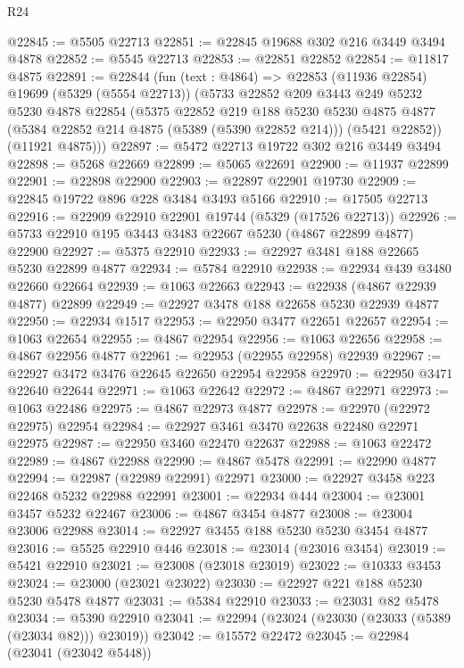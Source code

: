 \begin{lexlean}{R24}
\begin{coremodule}
@22845 := @5505 @22713
@22851 := @22845 @19688 @302 @216 @3449 @3494 @4878
@22852 := @5545 @22713
@22853 := @22851 @22852
@22854 := @11817 @4875
@22891 := @22844
    (fun (text : @4864) =>
    @22853
      (@11936 @22854)
      @19699
      (@5329 (@5554 @22713))
      (@5733
        @22852
        @209
        @3443
        @249
        @5232
        @5230
        @4878
        @22854
        (@5375
          @22852
          @219
          @188
          @5230
          @5230
          @4875
          @4877
          (@5384 @22852 @214 @4875 (@5389 (@5390 @22852 @214)))
          (@5421 @22852))
        (@11921 @4875)))
@22897 := @5472 @22713 @19722 @302 @216 @3449 @3494
@22898 := @5268 @22669
@22899 := @5065 @22691
@22900 := @11937 @22899
@22901 := @22898 @22900
@22903 := @22897 @22901 @19730
@22909 := @22845 @19722 @896 @228 @3484 @3493 @5166
@22910 := @17505 @22713
@22916 := @22909 @22910 @22901 @19744 (@5329 (@17526 @22713))
@22926 := @5733 @22910 @195 @3443 @3483 @22667 @5230 (@4867 @22899 @4877) @22900
@22927 := @5375 @22910
@22933 := @22927 @3481 @188 @22665 @5230 @22899 @4877
@22934 := @5784 @22910
@22938 := @22934 @439 @3480 @22660 @22664
@22939 := @1063 @22663
@22943 := @22938 (@4867 @22939 @4877) @22899
@22949 := @22927 @3478 @188 @22658 @5230 @22939 @4877
@22950 := @22934 @1517
@22953 := @22950 @3477 @22651 @22657
@22954 := @1063 @22654
@22955 := @4867 @22954
@22956 := @1063 @22656
@22958 := @4867 @22956 @4877
@22961 := @22953 (@22955 @22958) @22939
@22967 := @22927 @3472 @3476 @22645 @22650 @22954 @22958
@22970 := @22950 @3471 @22640 @22644
@22971 := @1063 @22642
@22972 := @4867 @22971
@22973 := @1063 @22486
@22975 := @4867 @22973 @4877
@22978 := @22970 (@22972 @22975) @22954
@22984 := @22927 @3461 @3470 @22638 @22480 @22971 @22975
@22987 := @22950 @3460 @22470 @22637
@22988 := @1063 @22472
@22989 := @4867 @22988
@22990 := @4867 @5478
@22991 := @22990 @4877
@22994 := @22987 (@22989 @22991) @22971
@23000 := @22927 @3458 @223 @22468 @5232 @22988 @22991
@23001 := @22934 @444
@23004 := @23001 @3457 @5232 @22467
@23006 := @4867 @3454 @4877
@23008 := @23004 @23006 @22988
@23014 := @22927 @3455 @188 @5230 @5230 @3454 @4877
@23016 := @5525 @22910 @446
@23018 := @23014 (@23016 @3454)
@23019 := @5421 @22910
@23021 := @23008 (@23018 @23019)
@23022 := @10333 @3453
@23024 := @23000 (@23021 @23022)
@23030 := @22927 @221 @188 @5230 @5230 @5478 @4877
@23031 := @5384 @22910
@23033 := @23031 @82 @5478
@23034 := @5390 @22910
@23041 := @22994 (@23024 (@23030 (@23033 (@5389 (@23034 @82))) @23019))
@23042 := @15572 @22472
@23045 := @22984 (@23041 (@23042 @5448))

\end{coremodule}
\end{lexlean}

